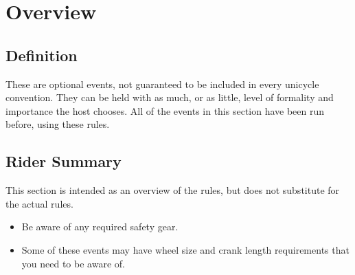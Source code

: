 \chapter{Overview}

\section{Definition}
These are optional events, not guaranteed to be included in every unicycle convention.
They can be held with as much, or as little, level of formality and importance the host chooses.
All of the events in this section have been run before, using these rules.

\section{Rider Summary}

This section is intended as an overview of the rules, but does not substitute for the actual rules.
\begin{itemize}
\item Be aware of any required safety gear.
\item Some of these events may have wheel size and crank length requirements that you need to be aware of.
\end{itemize}

